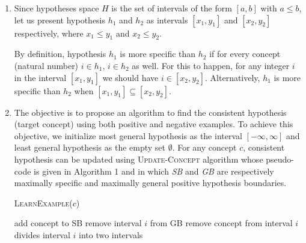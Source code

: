 \begin{enumerate}[label=(\alph*)]
\item Since hypotheses space $H$ is the set of intervals of the form $[a, b]$ with $a \leq b$, let us present hypothesis $h_1$ and $h_2$ as intervals $[x_1, y_1]$ and $[x_2, y_2]$ respectively, where $x_1 \leq y_1$ and $x_2 \leq y_2$.

By definition, hypothesis $h_1$ is more specific than $h_2$ if for every concept (natural number) $i \in h_1$, $i \in h_2$ as well.
For this to happen, for any integer $i$ in the interval $[x_1, y_1]$ we should have $i \in [x_2, y_2]$.
Alternatively, $h_1$ is more specific than $h_2$ when $[x_1, y_1] \subseteq [x_2, y_2]$.

\item The objective is to propose an algorithm to find the consistent hypothesis (target concept) using both positive and negative examples.
To achieve this objective, we initialize most general hypothesis as the interval $[-\infty, \infty]$ and least general hypothesis as the empty set $\emptyset$.
For any concept $c$, consistent hypothesis can be updated using \textsc{Update-Concept} algorithm whose pseudo-code is given in Algorithm 1 and in which \textit{SB} and \textit{GB} are respectively maximally specific and maximally general positive hypothesis boundaries.

\begin{algorithm}[H]
\caption{\textsc{LearnExample($c$)}}\label{euclid}
\begin{algorithmic}[1]
\State add concept to SB
\State remove interval $i$ from GB
\EndIf
\EndFor
\Else
{}
\State remove concept from interval $i$
\Comment divides interval $i$ into two intervals
\EndIf
\EndFor
\EndIf
\end{algorithmic}
\end{algorithm}

\end{enumerate}
